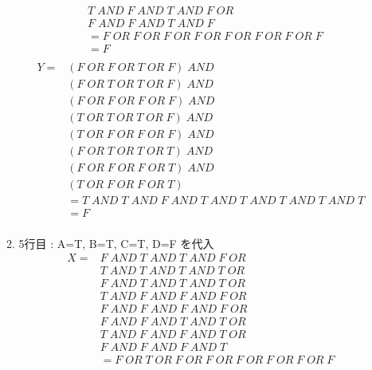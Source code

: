\documentclass[dvipdfmx,10pt, a4j]{jarticle}
\theoremstyle{definition}
\begin{document}
\begin{enumerate}[i)]
\begin{enumerate}[1)]
\begin{align*}
                &T\; AND\; F\; AND\; T\; AND\; F\; OR\\
                &F\; AND\; F\; AND\; T\; AND\; F\\
                &= F\; OR\; F\; OR\; F\; OR\; F\; OR\; F\; OR\; F\; OR\; F\; OR\; F\\
                &= F\\
            \end{align*}
            \begin{align*}
                Y = & (F\; OR\; F\; OR\; T\; OR\; F)\; AND\\
                & (F\; OR\; T\; OR\; T\; OR\; F)\; AND\\
                & (F\; OR\; F\; OR\; F\; OR\; F)\; AND\\
                & (T\; OR\; T\; OR\; T\; OR\; F)\; AND\\
                & (T\; OR\; F\; OR\; F\; OR\; F)\; AND\\
                & (F\; OR\; T\; OR\; T\; OR\; T)\; AND\\
                & (F\; OR\; F\; OR\; F\; OR\; T)\; AND\\
                & (T\; OR\; F\; OR\; F\; OR\; T)\\
                &= T\; AND\; T\; AND\; F\; AND\; T\; AND\; T\; AND\; T\; AND\; T\; AND\; T\\
                &= F\\
            \end{align*}
            \item 5行目 : A=T, B=T, C=T, D=F を代入\\
            \begin{align*}
                X = &F\; AND\; T\; AND\; T\; AND\; F\; OR\\
                &T\; AND\; T\; AND\; T\; AND\; T\; OR\\
                &F\; AND\; T\; AND\; T\; AND\; T\; OR\\
                &T\; AND\; F\; AND\; F\; AND\; F\; OR\\
                &F\; AND\; F\; AND\; F\; AND\; F\; OR\\
                &F\; AND\; F\; AND\; T\; AND\; T\; OR\\
                &T\; AND\; F\; AND\; F\; AND\; T\; OR\\
                &F\; AND\; F\; AND\; F\; AND\; T\\
                &= F\; OR\; T\; OR\; F\; OR\; F\; OR\; F\; OR\; F\; OR\; F\; OR\; F\\

\end{align*}
\end{enumerate}
\end{enumerate}
\end{document}
